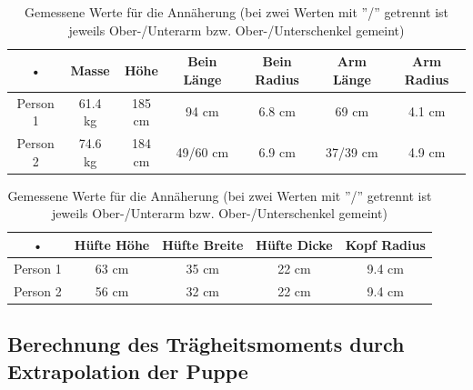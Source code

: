 \begin{table}
\begin{center}
\begin{tabular}{|c|c|c|c|c|c|c|}
\hline 
• & Masse & Höhe & Bein Länge & Bein Radius & Arm Länge & Arm Radius \\
\hline 
Person 1 & 61.4 kg & 185 cm & 94 cm & 6.8 cm & 69 cm & 4.1 cm \\
\hline 
Person 2 & 74.6 kg & 184 cm & 49/60 cm & 6.9 cm & 37/39 cm & 4.9 cm \\
\hline
\end{tabular}
\end{center}

\begin{center}
\begin{tabular}{|c|c|c|c|c|}
\hline
• & Hüfte Höhe & Hüfte Breite & Hüfte Dicke & Kopf Radius \\
\hline
Person 1 & 63 cm & 35 cm & 22 cm & 9.4 cm \\
\hline
Person 2 & 56 cm & 32 cm & 22 cm & 9.4 cm \\ 
\hline
\end{tabular}
\caption{Gemessene Werte für die Annäherung (bei zwei Werten mit ''/'' getrennt ist jeweils Ober-/Unterarm bzw. Ober-/Unterschenkel gemeint)}
\end{center}

\end{table}

\subsection{Berechnung des Trägheitsmoments durch Extrapolation der Puppe}


